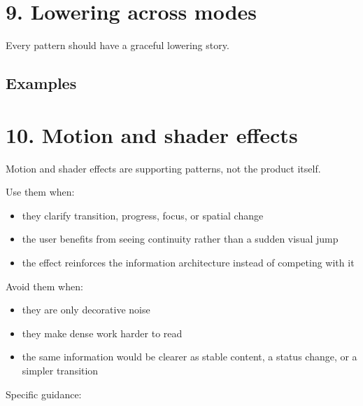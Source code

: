 \section{9. Lowering across modes}\label{record-023-lowering-across-modes}

Every pattern should have a graceful lowering story.

\subsection{Examples}\label{record-023-examples}

\section{10. Motion and shader effects}\label{record-023-motion-and-shader-effects}

Motion and shader effects are supporting patterns, not the product itself.

Use them when:

\begin{itemize}
\tightlist
\item
  they clarify transition, progress, focus, or spatial change
\item
  the user benefits from seeing continuity rather than a sudden visual jump
\item
  the effect reinforces the information architecture instead of competing with it
\end{itemize}

Avoid them when:

\begin{itemize}
\tightlist
\item
  they are only decorative noise
\item
  they make dense work harder to read
\item
  the same information would be clearer as stable content, a status change, or a simpler transition
\end{itemize}

Specific guidance:

